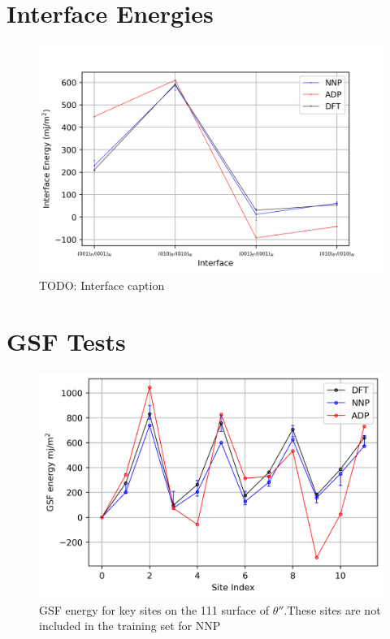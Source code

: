 \documentclass{article}
\begin{document}
%
\section{Interface Energies \newline%
}%
\label{sec:InterfaceEnergies}%


\begin{figure}[H]%
\centering%
\includegraphics[width=540px]{./figures/interface_energies.png}%
\caption{TODO: Interface caption}%
\end{figure}

%
\section{GSF Tests \newline%
}%
\label{sec:GSFTests}%


\begin{figure}[H]%
\centering%
\includegraphics[width=540px]{./figures/NOTINOQMD_00002-GSF_111.png}%
\caption{GSF energy for key sites on the 111 surface of  $\theta''$.These sites are not included in the  training set for NNP}%
\end{figure}
\end{document}
